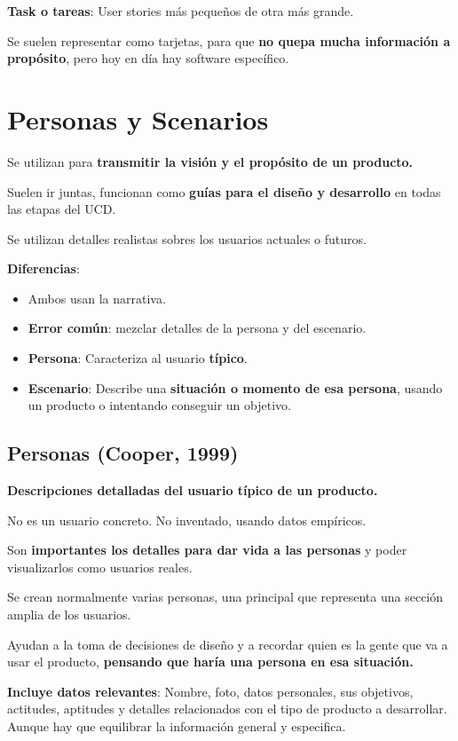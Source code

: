 \documentclass[12pt, twoside, openright]{report} %
\begin{document}
\textbf{Task o tareas}: User stories más pequeños de otra más grande.

Se suelen representar como tarjetas, para que \textbf{no quepa mucha
	información a propósito}, pero hoy en día hay software específico.

\section{Personas y Scenarios}

Se utilizan para \textbf{transmitir la visión y el propósito de un
	producto.}

Suelen ir juntas, funcionan como \textbf{guías para el diseño y
	desarrollo} en todas las etapas del UCD.

Se utilizan detalles realistas sobres los usuarios actuales o futuros.

\textbf{Diferencias}:

\begin{itemize}
	\item Ambos usan la narrativa.
	\item \textbf{Error común}: mezclar detalles de la persona y del escenario.
	\item \textbf{Persona}: Caracteriza al usuario \textbf{típico}.
	\item \textbf{Escenario}: Describe una \textbf{situación o momento de esa
		      persona}, usando un producto o intentando conseguir un objetivo.
\end{itemize}

\subsection{Personas (Cooper, 1999)}

\textbf{Descripciones detalladas del usuario típico de un producto.}

No es un usuario concreto. No inventado, usando datos empíricos.

Son \textbf{importantes los detalles para dar vida a las personas} y
poder visualizarlos como usuarios reales.

Se crean normalmente varias personas, una principal que representa una
sección amplia de los usuarios.

Ayudan a la toma de decisiones de diseño y a recordar quien es la gente
que va a usar el producto, \textbf{pensando que haría una persona en esa
	situación.}

\textbf{Incluye datos relevantes}: Nombre, foto, datos personales, sus
objetivos, actitudes, aptitudes y detalles relacionados con el tipo de
producto a desarrollar. Aunque hay que equilibrar la información general
y especifica.
\end{document}
